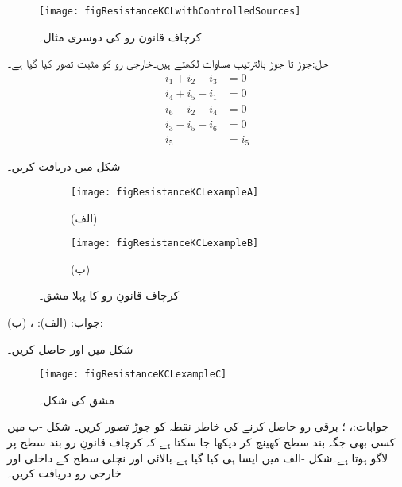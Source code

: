\begin{figure}
\centering
\texttt{[image: figResistanceKCLwithControlledSources]}
\caption{کرچاف قانون رو کی دوسری مثال۔}
\label{شکل_مزاحمتی_کرچاف_قانون_رو_دوسری_مثال}
\end{figure}

حل:جوڑ  تا جوڑ  بالترتیب مساوات لکھتے ہیں۔خارجی رو کو مثبت تصور کیا گیا ہے۔
\begin{align*}
i_1+i_2-i_3&=0\\
i_4+i_5-i_1&=0\\
i_6-i_2-i_4&=0\\
i_3-i_5-i_6&=0\\
i_5&=i_5
\end{align*}
\FloatBarrier

شکل  میں  دریافت کریں۔
\begin{figure}
\centering
\begin{subfigure}{0.5\textwidth}
\centering
\texttt{[image: figResistanceKCLexampleA]}
\caption*{(الف)}
\end{subfigure}%
%
\begin{subfigure}{0.5\textwidth}
\centering
\texttt{[image: figResistanceKCLexampleB]}
\caption*{(ب)}
\end{subfigure}%
\caption{کرچاف قانونِ رو کا پہلا مشق۔}
\label{مشق_مزاحمتی_اکلوتی_مزاحمت}
\end{figure}

جواب: (الف): ، (ب):
\FloatBarrier


شکل  میں  اور  حاصل کریں۔
\begin{figure}[!h]
\centering
\texttt{[image: figResistanceKCLexampleC]}
\caption{مشق  کی شکل۔}
\label{مشق_مزاحمتی_کرچاف_قانون_رو_دوسری_مشق}
\end{figure}

جوابات:، ؛  برقی رو  حاصل کرنے کی خاطر نقطہ  کو جوڑ تصور کریں۔
\FloatBarrier
شکل -ب میں کسی بھی جگہ بند سطح کھینچ کر دیکھا جا سکتا ہے کہ کرچاف قانونِ رو بند سطح پر لاگو ہوتا ہے۔شکل -الف میں ایسا ہی کیا گیا ہے۔بالائی اور نچلی سطح کے داخلی اور خارجی رو دریافت کریں۔


